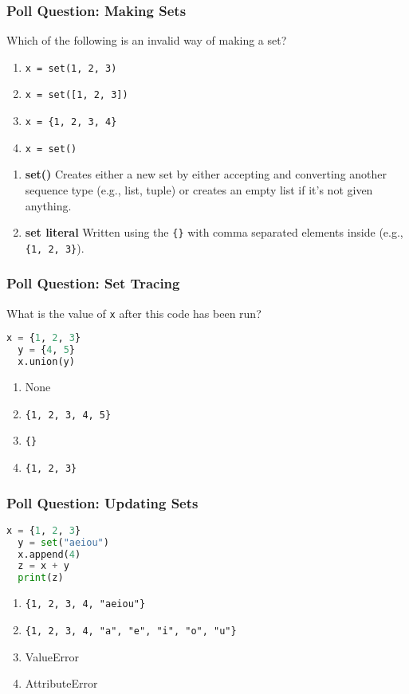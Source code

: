 \documentclass[xcolor=table]{beamer}
\begin{document}
%
%
\begin{frame}[fragile]
  \frametitle{Poll Question: Making Sets}
  Which of the following is an invalid way of making a set?
  \begin{enumerate}[A] 
    \item \lstinline|x = set(1, 2, 3)| 
    \item \lstinline|x = set([1, 2, 3])| 
    \item \lstinline|x = {1, 2, 3, 4}| 
    \item \lstinline|x = set()|
  \end{enumerate}
  \pause
  \vfill
  \vfill
  \begin{enumerate}
    \item \textbf{set()} \textrightarrow Creates either a new set by either accepting and converting another sequence type (e.g., list, tuple) or creates an empty list if it's not given anything.
    \item \textbf{set literal} \textrightarrow Written using the \lstinline|{}| with comma separated elements inside (e.g., \lstinline|{1, 2, 3}|).
  \end{enumerate}
\end{frame}

%
%
\begin{frame}[fragile]
  \frametitle{Poll Question: Set Tracing}
  What is the value of \lstinline|x| after this code has been run?
  \begin{lstlisting}[language=Python, autogobble]
  x = {1, 2, 3}
  y = {4, 5}
  x.union(y)
  \end{lstlisting}
  \vfill
  \begin{enumerate}[A] 
    \item None
    \item \lstinline|{1, 2, 3, 4, 5}|
    \item \lstinline|{}|
    \item \lstinline|{1, 2, 3}|
  \end{enumerate}
\end{frame}


%
%
\begin{frame}[fragile]
  \frametitle{Poll Question: Updating Sets}
  \begin{lstlisting}[language=Python, autogobble]
  x = {1, 2, 3}
  y = set("aeiou")
  x.append(4)
  z = x + y
  print(z)
  \end{lstlisting}
  \vfill
  \begin{enumerate}[A] 
    \item \lstinline|{1, 2, 3, 4, "aeiou"}|
    \item \lstinline|{1, 2, 3, 4, "a", "e", "i", "o", "u"}|
    \item ValueError
    \item AttributeError
  \end{enumerate}
\end{frame}
\end{document}
